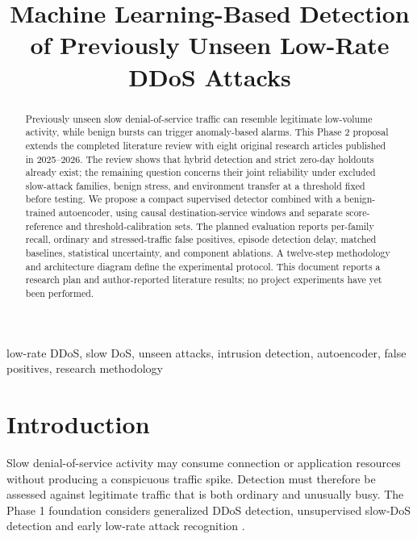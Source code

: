\documentclass[conference]{IEEEtran}
\begin{document}
\title{Machine Learning-Based Detection of Previously Unseen Low-Rate DDoS Attacks}
\author{
\and
{}
}
\maketitle
\pagestyle{plain}
\thispagestyle{plain}
\begin{abstract}
Previously unseen slow denial-of-service traffic can resemble legitimate low-volume activity, while benign bursts can trigger anomaly-based alarms. This Phase 2 proposal extends the completed literature review with eight original research articles published in 2025--2026. The review shows that hybrid detection and strict zero-day holdouts already exist; the remaining question concerns their joint reliability under excluded slow-attack families, benign stress, and environment transfer at a threshold fixed before testing. We propose a compact supervised detector combined with a benign-trained autoencoder, using causal destination-service windows and separate score-reference and threshold-calibration sets. The planned evaluation reports per-family recall, ordinary and stressed-traffic false positives, episode detection delay, matched baselines, statistical uncertainty, and component ablations. A twelve-step methodology and architecture diagram define the experimental protocol. This document reports a research plan and author-reported literature results; no project experiments have yet been performed.
\end{abstract}
\begin{IEEEkeywords}
low-rate DDoS, slow DoS, unseen attacks, intrusion detection, autoencoder, false positives, research methodology
\end{IEEEkeywords}

\section{Introduction}
\label{sec:intro}
Slow denial-of-service activity may consume connection or application resources without producing a conspicuous traffic spike. Detection must therefore be assessed against legitimate traffic that is both ordinary and unusually busy. The Phase 1 foundation considers generalized DDoS detection, unsupervised slow-DoS detection and early low-rate attack recognition \cite{ref1,ref2,ref3}.
\end{document}

